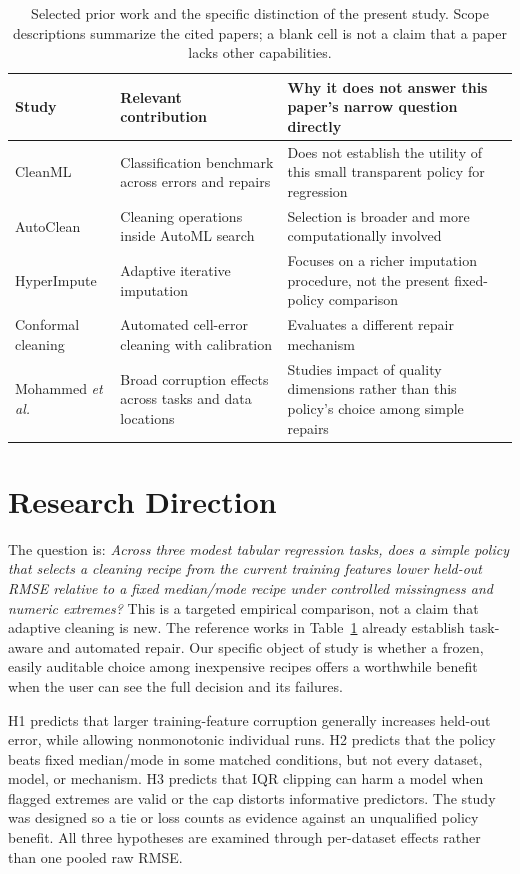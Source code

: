 \documentclass[conference]{IEEEtran}
\begin{document}
\begin{table}[t]
\centering\caption{Selected prior work and the specific distinction of the present study. Scope descriptions summarize the cited papers; a blank cell is not a claim that a paper lacks other capabilities.}\label{tab:related}
\footnotesize
\begin{tabular}{p{}p{}p{}}
\toprule
Study & Relevant contribution & Why it does not answer this paper's narrow question directly\\
\midrule
CleanML \cite{Li2021} & Classification benchmark across errors and repairs & Does not establish the utility of this small transparent policy for regression\\
AutoClean \cite{Neutatz2022} & Cleaning operations inside AutoML search & Selection is broader and more computationally involved\\
HyperImpute \cite{Jarrett2022} & Adaptive iterative imputation & Focuses on a richer imputation procedure, not the present fixed-policy comparison\\
Conformal cleaning \cite{Jger2024} & Automated cell-error cleaning with calibration & Evaluates a different repair mechanism\\
Mohammed \emph{et al.} \cite{Mohammed2025} & Broad corruption effects across tasks and data locations & Studies impact of quality dimensions rather than this policy's choice among simple repairs\\
\bottomrule
\end{tabular}
\end{table}

\section{Research Direction}
The question is: \emph{Across three modest tabular regression tasks, does a simple policy that selects a cleaning recipe from the current training features lower held-out RMSE relative to a fixed median/mode recipe under controlled missingness and numeric extremes?} This is a targeted empirical comparison, not a claim that adaptive cleaning is new. The reference works in Table~\ref{tab:related} already establish task-aware and automated repair. Our specific object of study is whether a frozen, easily auditable choice among inexpensive recipes offers a worthwhile benefit when the user can see the full decision and its failures.

H1 predicts that larger training-feature corruption generally increases held-out error, while allowing nonmonotonic individual runs. H2 predicts that the policy beats fixed median/mode in some matched conditions, but not every dataset, model, or mechanism. H3 predicts that IQR clipping can harm a model when flagged extremes are valid or the cap distorts informative predictors. The study was designed so a tie or loss counts as evidence against an unqualified policy benefit. All three hypotheses are examined through per-dataset effects rather than one pooled raw RMSE.
\end{document}
